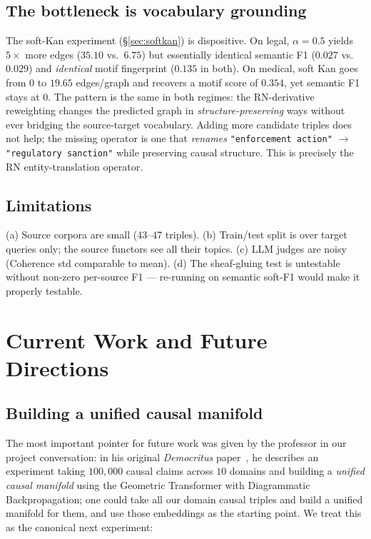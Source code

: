 \documentclass[10pt,letterpaper]{article}
\begin{document}
\subsection{The bottleneck is vocabulary grounding}

The soft-Kan experiment (\S\ref{sec:softkan}) is dispositive. On legal, $\alpha{=}0.5$ yields $5{\times}$ more edges ($35.10$ vs.\ $6.75$) but essentially identical semantic F1 ($0.027$ vs.\ $0.029$) and \emph{identical} motif fingerprint ($0.135$ in both). On medical, soft Kan goes from $0$ to $19.65$ edges/graph and recovers a motif score of $0.354$, yet semantic F1 stays at $0$. The pattern is the same in both regimes: the RN-derivative reweighting changes the predicted graph in \emph{structure-preserving} ways without ever bridging the source-target vocabulary. Adding more candidate triples does not help; the missing operator is one that \emph{renames} \texttt{"enforcement action"} ${\to}$ \texttt{"regulatory sanction"} while preserving causal structure. This is precisely the RN entity-translation operator.

\subsection{Limitations}

(a) Source corpora are small (43--47 triples). (b) Train/test split is over target queries only; the source functors see all their topics. (c) LLM judges are noisy (Coherence std comparable to mean). (d) The sheaf-gluing test is untestable without non-zero per-source F1 --- re-running on semantic soft-F1 would make it properly testable.

\section{Current Work and Future Directions}\label{sec:cw}

\subsection{Building a unified causal manifold}

The most important pointer for future work was given by the professor in our project conversation: in his original \emph{Democritus} paper~\cite{democritus}, he describes an experiment taking $100{,}000$ causal claims across $10$ domains and building a \emph{unified causal manifold} using the Geometric Transformer with Diagrammatic Backpropagation; one could take all our domain causal triples and build a unified manifold for them, and use those embeddings as the starting point. We treat this as the canonical next experiment:
\end{document}
